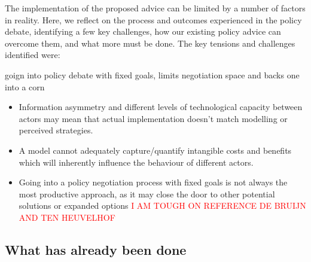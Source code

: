 The implementation of the proposed advice can be limited by a number of factors in reality. Here, we reflect on the process and outcomes experienced in the policy debate, identifying a few key challenges, how our existing policy advice can overcome them, and what more must be done. The key tensions and challenges identified were:

goign into policy debate with fixed goals, limits negotiation space and backs one into a corn
\begin{itemize}
    \item Information asymmetry and different levels of technological capacity between actors may mean that actual implementation doesn't match modelling or perceived strategies.
    \item A model cannot adequately capture/quantify intangible costs and benefits which will inherently influence the behaviour of different actors.
    \item Going into a policy negotiation process with fixed goals is not always the most productive approach, as it may close the door to other potential solutions or expanded options \textcolor{red}{I AM TOUGH ON REFERENCE DE BRUIJN AND TEN HEUVELHOF}
     
\end{itemize}

\subsection{What has already been done}

